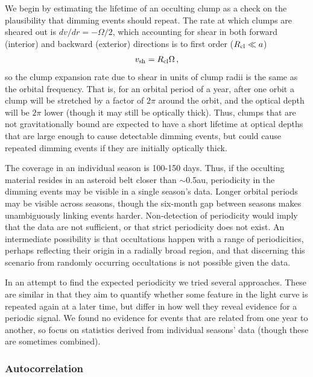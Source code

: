\documentclass[]{rsos}
\begin{document}
We begin by estimating the lifetime of an occulting clump as a check on the plausibility
that dimming events should repeat. The rate at which clumps are sheared out is
$dv/dr = - \Omega/2$, which accounting for shear in both forward (interior) and backward
(exterior) directions is to first order ($R_{\rm cl} \ll a$)
\begin{equation}\label{eq:shear}
  v_{\rm sh} = R_{\rm cl} \Omega \, ,
\end{equation}
so the clump expansion rate due to shear in units of clump radii is the same as the
orbital frequency. That is, for an orbital period of a year, after one orbit a clump will
be stretched by a factor of $2\pi$ around the orbit, and the optical depth will be $2\pi$
lower (though it may still be optically thick). Thus, clumps that are not gravitationally
bound are expected to have a short lifetime at optical depths that are large enough to
cause detectable dimming events, but could cause repeated dimming events if they are
initially optically thick.

The coverage in an individual season is 100-150 days. Thus, if the occulting material
resides in an asteroid belt closer than $\sim$0.5au, periodicity in the dimming events
may be visible in a single season's data. Longer orbital periods may be visible across
seasons, though the six-month gap between seasons makes unambiguously linking events
harder. Non-detection of periodicity would imply that the data are not sufficient, or
that strict periodicity does not exist. An intermediate possibility is that occultations
happen with a range of periodicities, perhaps reflecting their origin in a radially broad
region, and that discerning this scenario from randomly occurring occultations is not
possible given the data.

In an attempt to find the expected periodicity we tried several approaches. These are
similar in that they aim to quantify whether some feature in the light curve is repeated
again at a later time, but differ in how well they reveal evidence for a periodic
signal. We found no evidence for events that are related from one year to another, so
focus on statistics derived from individual seasons' data (though these are sometimes
combined).

\subsubsection{Autocorrelation}\label{sss:auto}
\end{document}
